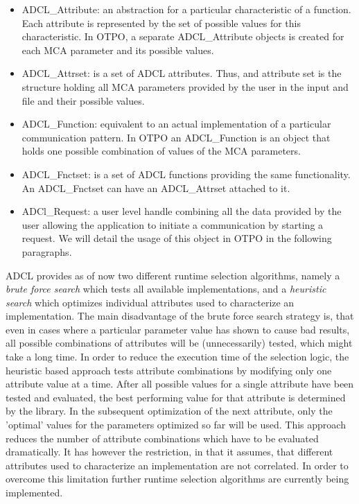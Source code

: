 \begin{itemize}
\item ADCL\_Attribute: an abstraction for a particular
  characteristic of a function. Each attribute is represented by the set of 
  possible values for this characteristic. In OTPO, a separate ADCL\_Attribute
  objects is created for each MCA parameter and its possible  values.
\item ADCL\_Attrset: is a set of ADCL attributes. Thus, and 
  attribute set is the structure holding all MCA parameters provided by the user in the input
  and file and their possible values.
\item ADCL\_Function: equivalent to an actual implementation
  of a particular communication pattern. In OTPO an ADCL\_Function is an
  object that holds one possible combination of values of the MCA
  parameters.
\item ADCL\_Fnctset: is a set of ADCL functions providing the same
	functionality. An ADCL\_Fnctset can have an ADCL\_Attrset attached to it. 
\item ADCl\_Request: a user level handle combining all the data 
  provided by the user allowing the application to initiate a communication
  by starting a request. We will detail the usage of this object in OTPO  
  in the following paragraphs. 
\end{itemize}

ADCL provides as of now two different runtime selection algorithms, namely a {\it brute force search} which tests all available implementations, and a {\it heuristic search} which optimizes individual attributes used to characterize an implementation. The main disadvantage of the brute force search strategy is, that even in cases where a particular parameter value has shown to cause bad results, all possible combinations of attributes will be (unnecessarily) tested, which might take a long time. In order to reduce the execution time of the selection logic, the heuristic based approach tests attribute combinations by modifying only one attribute value at a time. After all possible values for a single attribute have been tested and evaluated, the best performing value for that attribute is determined by the library. In the subsequent optimization of the next attribute, only the 'optimal' values for the parameters optimized so far will be used. This approach reduces the number of attribute combinations which have to be evaluated dramatically. It has however the restriction, in that it assumes, that different attributes used to characterize an implementation are not correlated. In order to overcome this limitation further runtime selection algorithms are currently being implemented.

